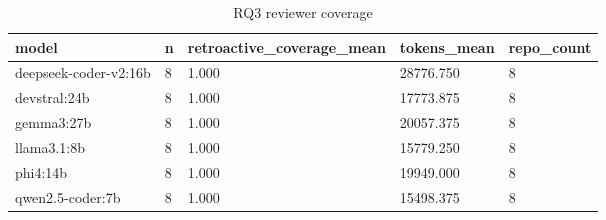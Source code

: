 \begin{table}[t]
\centering\small
\caption{RQ3 reviewer coverage}\label{tab:rq3_by_model}
\begin{tabular}{lllll}
\toprule
model & n & retroactive\_coverage\_mean & tokens\_mean & repo\_count \\
\midrule
deepseek-coder-v2:16b & 8 & 1.000 & 28776.750 & 8 \\
devstral:24b & 8 & 1.000 & 17773.875 & 8 \\
gemma3:27b & 8 & 1.000 & 20057.375 & 8 \\
llama3.1:8b & 8 & 1.000 & 15779.250 & 8 \\
phi4:14b & 8 & 1.000 & 19949.000 & 8 \\
qwen2.5-coder:7b & 8 & 1.000 & 15498.375 & 8 \\
\bottomrule
\end{tabular}
\end{table}

